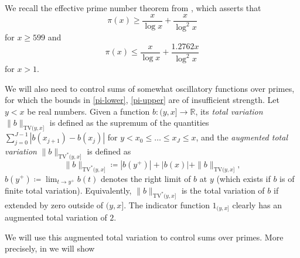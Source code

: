 \documentclass[12pt,a4paper,reqno]{amsart}
\numberwithin{equation}{section}
\theoremstyle{plain}
\theoremstyle{definition}
\newcommand\R{\mathbb{R}}
\begin{document}
We recall the effective prime number theorem from \cite[Corollary 5.2]{dusart}, which asserts that
\begin{equation}\label{pi-lower}
  \pi(x) \geq \frac{x}{\log x} + \frac{x}{\log^2 x}
\end{equation}
for $x \geq 599$ and
\begin{equation}\label{pi-upper}
  \pi(x) \leq \frac{x}{\log x} + \frac{1.2762 x}{\log^2 x}
\end{equation}
for $x >1$.  

We will also need to control sums of somewhat oscillatory functions over primes, for which the bounds in \eqref{pi-lower}, \eqref{pi-upper} are of insufficient strength. Let $y<x$ be real numbers. Given a function $b \colon (y,x] \to \R$, its \emph{total variation}
$\|b\|_{\mathrm{TV}(y,x]}$ is defined as the supremum of the quantities $\sum_{j=0}^{J-1} |b(x_{j+1})-b(x_j)|$ for $y < x_0 \leq \dots \leq x_J \leq x$, and the \emph{augmented total variation} $\|b\|_{\mathrm{TV}^*(y,x]}$ is defined as
$$
\|b\|_{\mathrm{TV}^*(y,x]}
\coloneqq |b(y^+)| + |b(x)| + \|b\|_{\mathrm{TV}(y,x]},$$
$b(y^+) \coloneqq \lim_{t \to y^+} b(t)$ denotes the right limit of $b$ at $y$ (which exists if $b$ is of finite total variation).  Equivalently, $\|b\|_{\mathrm{TV}^*(y,x]}$ is the total variation of $b$ if extended by zero outside of $(y,x]$. The indicator function $1_{(y,x]}$ clearly has an augmented total variation of $2$.

We will use this augmented total variation to control sums over primes.  More precisely, in  we will show
\end{document}
